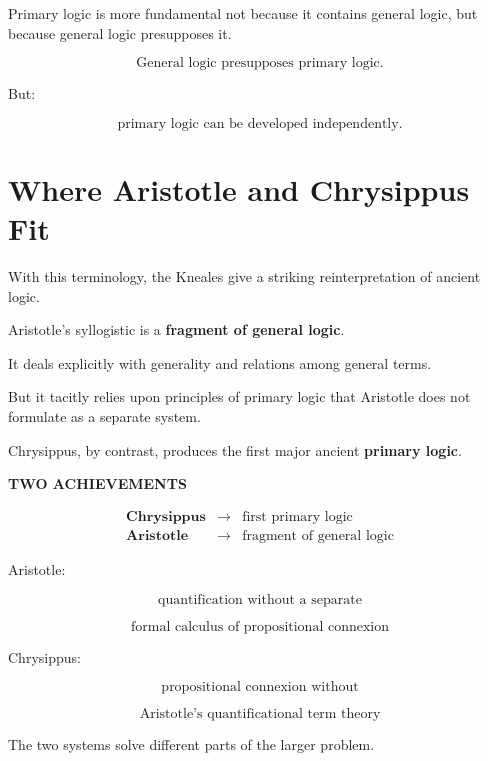 \documentclass[11pt]{article}
\begin{document}
Primary logic is more fundamental not because it contains general
logic, but because general logic presupposes it.

\begin{whiteboard}
\[
\boxed{
\text{General logic presupposes primary logic.}
}
\]

But:

\[
\text{primary logic can be developed independently.}
\]
\end{whiteboard}

\section{Where Aristotle and Chrysippus Fit}

With this terminology, the Kneales give a striking reinterpretation
of ancient logic.

Aristotle's syllogistic is a \textbf{fragment of general logic}.

It deals explicitly with generality and relations among general
terms.

But it tacitly relies upon principles of primary logic that
Aristotle does not formulate as a separate system.

Chrysippus, by contrast, produces the first major ancient
\textbf{primary logic}.

\begin{whiteboard}
\textbf{TWO ACHIEVEMENTS}

\[
\begin{array}{rcl}
\textbf{Chrysippus}
&\rightarrow&
\boxed{\text{first primary logic}}
\\[0.8em]
\textbf{Aristotle}
&\rightarrow&
\boxed{\text{fragment of general logic}}
\end{array}
\]

Aristotle:

\[
\text{quantification without a separate}
\]

\[
\text{formal calculus of propositional connexion}
\]

Chrysippus:

\[
\text{propositional connexion without}
\]

\[
\text{Aristotle's quantificational term theory}
\]
\end{whiteboard}

The two systems solve different parts of the larger problem.
\end{document}
